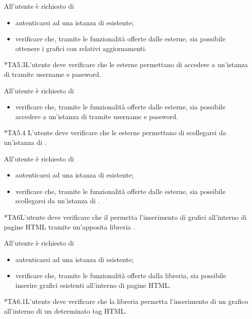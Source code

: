 		All'utente  è richiesto di
		\begin{itemize}
			\item autenticarsi ad una istanza di \projectname{} esistente;
			\item verificare che, tramite le funzionalità offerte dalle  esterne, sia possibile ottenere i grafici con relativi aggiornamenti.
		\end{itemize}

	*{TA5.3}L'utente  deve verificare che le  esterne permettano di accedere a un'istanza di \projectname{} tramite username e password.
		
		All'utente  è richiesto di
		\begin{itemize}
			\item verificare che, tramite le funzionalità offerte dalle  esterne, sia possibile accedere a un'istanza di \projectname{} tramite username e password.
		\end{itemize}

	*{TA5.4} L'utente  deve verificare che le  esterne permettano di scollegarsi  da un'istanza di \projectname{}.
		
		All'utente  è richiesto di
		\begin{itemize}
			\item autenticarsi ad una istanza di \projectname{} esistente;
			\item verificare che, tramite le funzionalità offerte dalle  esterne, sia possibile scollegarsi da un'istanza di \projectname{}.
		\end{itemize}

	*{TA6}L'utente  deve verificare che il  permetta l'inserimento di grafici all'interno di pagine HTML tramite un'apposita libreria .
		
		All'utente  è richiesto di
		\begin{itemize}
			\item autenticarsi ad una istanza di \projectname{} esistente;
			\item verificare che, tramite le funzionalità offerte dalla libreria, sia possibile inserire grafici esistenti all'interno di pagine HTML.
		\end{itemize}

	*{TA6.1}L'utente  deve verificare che la libreria permetta l'inserimento di un grafico all'interno di un determinato tag HTML.
		
